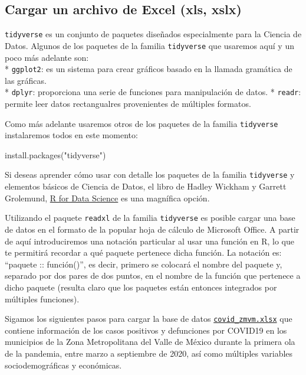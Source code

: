 \documentclass[
  11pt,
  oneside]{book}
\newenvironment{Shaded}{\begin{snugshade}}{\end{snugshade}}
\newcommand{\FunctionTok}[1]{\textcolor[rgb]{0.00,0.00,0.00}{#1}}
\newcommand{\NormalTok}[1]{#1}
\newcommand{\StringTok}[1]{\textcolor[rgb]{0.31,0.60,0.02}{#1}}
\begin{document}
\hypertarget{cargar-un-archivo-de-excel-xls-xslx}{%
\subsection{Cargar un archivo de Excel (xls, xslx)}\label{cargar-un-archivo-de-excel-xls-xslx}}

\texttt{tidyverse} es un conjunto de paquetes diseñados especialmente para la Ciencia de Datos. Algunos de los paquetes de la familia \texttt{tidyverse} que usaremos aquí y un poco más adelante son:\\
* \texttt{ggplot2}: es un sistema para crear gráficos basado en la llamada gramática de las gráficas.\\
* \texttt{dplyr}: proporciona una serie de funciones para manipulación de datos. * \texttt{readr}: permite leer datos rectangualres provenientes de múltiples formatos.

Como más adelante usaremos otros de los paquetes de la familia \texttt{tidyverse} instalaremos todos en este momento:

\begin{Shaded}
\begin{Highlighting}[]
\FunctionTok{install.packages}\NormalTok{(}\StringTok{"tidyverse"}\NormalTok{)}
\end{Highlighting}
\end{Shaded}

Si deseas aprender cómo usar con detalle los paquetes de la familia \texttt{tidyverse} y elementos básicos de Ciencia de Datos, el libro de Hadley Wickham y Garrett Grolemund, \href{https://r4ds.had.co.nz/index.html}{R for Data Science} es una magnífica opción.

Utilizando el paquete \texttt{readxl} de la familia \texttt{tidyverse} es posible cargar una base de datos en el formato de la popular hoja de cálculo de Microsoft Office. A partir de aquí introduciremos una notación particular al usar una función en R, lo que te permitirá recordar a qué paquete pertenece dicha función. La notación es: ``paquete :: función()'', es decir, primero se colocará el nombre del paquete y, separado por dos pares de dos puntos, en el nombre de la función que pertenece a dicho paquete (resulta claro que los paquetes están entonces integrados por múltiples funciones).

Sigamos los siguientes pasos para cargar la base de datos \href{https://bit.ly/covid_zmvm}{\texttt{covid\_zmvm.xlsx}} que contiene información de los casos positivos y defunciones por COVID19 en los municipios de la Zona Metropolitana del Valle de México durante la primera ola de la pandemia, entre marzo a septiembre de 2020, así como múltiples variables sociodemográficas y económicas.
\end{document}
